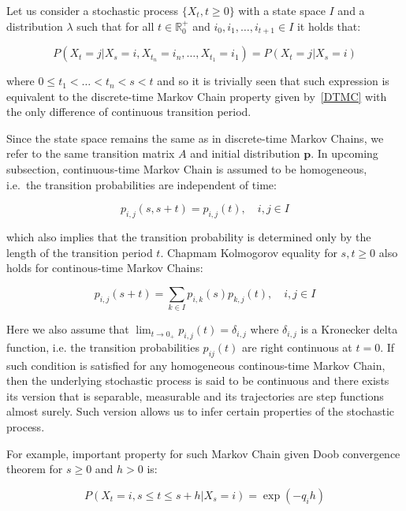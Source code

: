 Let us consider a stochastic process $\{X_t,t \geq 0\}$ with a state space $I$ and 
a distribution $\lambda$ such that for all $t \in \mathbb{R}_0^+$ and $i_0,i_1,\ldots,i_{t+1} \in I$ it holds that:

\begin{equation}
P(X_t=j|X_s=i, X_{t_n}=i_n,\ldots,X_{t_1}=i_1) = P(X_t=j|X_s=i)
\end{equation}

where $0 \leq t_1 < \ldots < t_n < s < t $ and so it is trivially seen that such expression is equivalent to the discrete-time Markov Chain property 
given by~\ref{DTMC} with the only difference of continuous transition period.

Since the state space remains the same as in discrete-time Markov Chains, we refer to the same transition matrix $A$ and initial distribution $\textbf{p}$.
In upcoming subsection, continuous-time Markov Chain is assumed to be homogeneous, i.e.\ the transition probabilities are independent of time:

\begin{equation}
p_{i,j}(s,s+t) = p_{i,j}(t), \quad i,j \in I
\end{equation}

which also implies that the transition probability is determined only by the length of the transition period $t$. 
Chapmam Kolmogorov equality for $s,t \geq 0$ also holds for continous-time Markov Chains:

\begin{equation}
p_{i,j}(s+t) = \sum_{k \in I} p_{i,k}(s) p_{k,j}(t), \quad i,j \in I
\end{equation}

Here we also assume that $\lim_{t \to 0_{+}} p_{i,j}(t) = \delta_{i,j}$ where $\delta_{i,j}$ is a Kronecker delta function, 
i.e. the transition probabilities $p_{ij}(t)$ are right continuous at $t=0$. If such condition is satisfied for any homogeneous continous-time Markov Chain, 
then the underlying stochastic process is said to be continuous and there exists its version that is separable, measurable and its trajectories are step functions almost surely. Such version allows us to infer 
certain properties of the stochastic process. 

For example, important property for such Markov Chain given Doob convergence theorem for $s \geq 0$ and $h>0$ is:

\begin{equation}
P(X_t = i, s \leq t \leq s+h|X_s=i) = \exp(-{q_i}h)
\end{equation}

